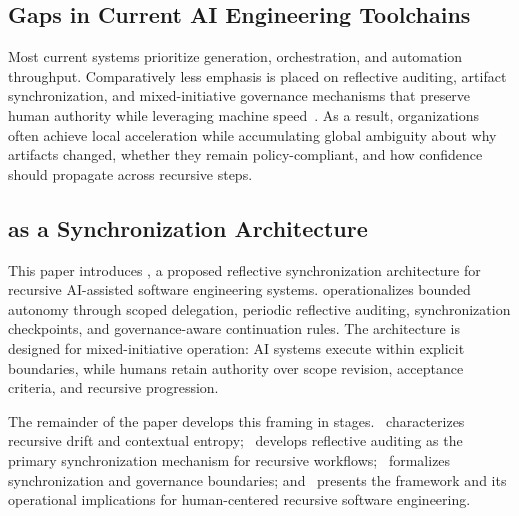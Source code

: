 \subsection{Gaps in Current AI Engineering Toolchains}

Most current systems prioritize generation, orchestration, and automation throughput. Comparatively less emphasis is placed on reflective auditing, artifact synchronization, and mixed-initiative governance mechanisms that preserve human authority while leveraging machine speed~\cite{Amershi2014InteractiveML,Shneiderman2020HCAI}. As a result, organizations often achieve local acceleration while accumulating global ambiguity about why artifacts changed, whether they remain policy-compliant, and how confidence should propagate across recursive steps.

\subsection{ as a Synchronization Architecture}

This paper introduces \textit{}, a proposed reflective synchronization architecture for recursive AI-assisted software engineering systems.  operationalizes bounded autonomy through scoped delegation, periodic reflective auditing, synchronization checkpoints, and governance-aware continuation rules. The architecture is designed for mixed-initiative operation: AI systems execute within explicit boundaries, while humans retain authority over scope revision, acceptance criteria, and recursive progression.

The remainder of the paper develops this framing in stages.~ characterizes recursive drift and contextual entropy;~ develops reflective auditing as the primary synchronization mechanism for recursive workflows;~ formalizes synchronization and governance boundaries; and~ presents the  framework and its operational implications for human-centered recursive software engineering.
